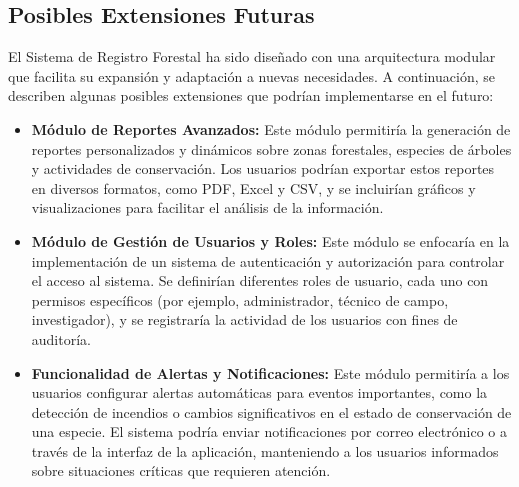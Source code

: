 \subsection{Posibles Extensiones Futuras}
El Sistema de Registro Forestal ha sido diseñado con una arquitectura modular que facilita su expansión y adaptación a nuevas necesidades. A continuación, se describen algunas posibles extensiones que podrían implementarse en el futuro:
\begin{itemize}
    \item \textbf{Módulo de Reportes Avanzados:} Este módulo permitiría la generación de reportes personalizados y dinámicos sobre zonas forestales, especies de árboles y actividades de conservación. Los usuarios podrían exportar estos reportes en diversos formatos, como PDF, Excel y CSV, y se incluirían gráficos y visualizaciones para facilitar el análisis de la información.
    \item \textbf{Módulo de Gestión de Usuarios y Roles:} Este módulo se enfocaría en la implementación de un sistema de autenticación y autorización para controlar el acceso al sistema. Se definirían diferentes roles de usuario, cada uno con permisos específicos (por ejemplo, administrador, técnico de campo, investigador), y se registraría la actividad de los usuarios con fines de auditoría.
    \item \textbf{Funcionalidad de Alertas y Notificaciones:} Este módulo permitiría a los usuarios configurar alertas automáticas para eventos importantes, como la detección de incendios o cambios significativos en el estado de conservación de una especie. El sistema podría enviar notificaciones por correo electrónico o a través de la interfaz de la aplicación, manteniendo a los usuarios informados sobre situaciones críticas que requieren atención.
\end{itemize}

